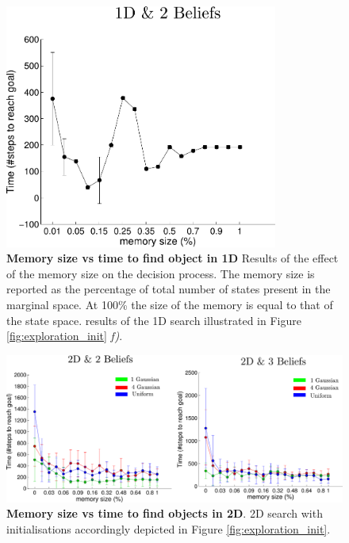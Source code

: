 \begin{figure}	
  \centering
  \includegraphics[width=0.8\textwidth]{./ch5-MLMF/Figures/exper_mem_1d.pdf}
  \caption{\textbf{Memory size vs time to find object in 1D} Results of the effect of the memory size on the decision process.
  The memory size is reported as the percentage of total number of states present in the marginal space. At 100\% the size
  of the memory is equal to that of the state space. results of the 1D search illustrated in Figure \ref{fig:exploration_init} \textit{f)}.} 
  \label{fig:time_to_reach_goal_1D}
\end{figure}

\begin{figure}
  \centering
  \includegraphics[width=\textwidth]{./ch5-MLMF/Figures/exper_mem_all.pdf}
  \caption{\textbf{Memory size vs time to find objects in 2D}. 2D search with initialisations accordingly depicted in Figure \ref{fig:exploration_init}.}
   \label{fig:time_to_reach_goal_2D}
\end{figure}



